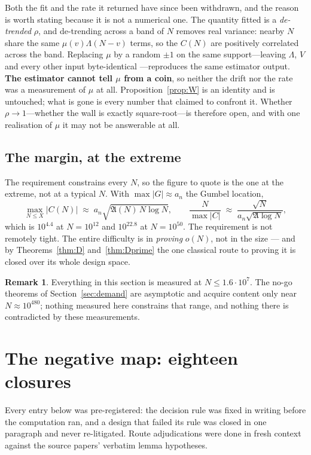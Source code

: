 \documentclass[11pt,a4paper]{article}
\theoremstyle{plain}
\theoremstyle{definition}
\newtheorem{remark}[theorem]{Remark}
\begin{document}
Both the fit and the rate it returned have since been withdrawn, and
the reason is worth stating because it is not a numerical one. The
quantity fitted is a \emph{de-trended} $\rho$, and de-trending across a
band of $N$ removes real variance: nearby $N$ share the same
$\mu(v)\Lambda(N-v)$ terms, so the $C(N)$ are positively correlated
across the band. Replacing $\mu$ by a random $\pm1$ on the same
support---leaving $\Lambda$, $V$ and every other input byte-identical
---reproduces the same estimator output. \textbf{The estimator cannot
tell $\mu$ from a coin}, so neither the drift nor the rate was a
measurement of $\mu$ at all. Proposition~\ref{prop:W} is an identity
and is untouched; what is gone is every number that claimed to confront
it. Whether $\rho\to1$---whether the wall is exactly square-root---is
therefore open, and with one realisation of $\mu$ it may not be
answerable at all.

\subsection{The margin, at the extreme}

The requirement constrains every $N$, so the figure to quote is the one
at the extreme, not at a typical $N$. With
$\max|G|\approx a_n$ the Gumbel location,
\[
  \max_{N\le X}|C(N)| \;\approx\; a_n\sqrt{\mathfrak A(N)\,N\log N},
  \qquad
  \frac{N}{\max|C|}\;\approx\;
  \frac{\sqrt N}{a_n\sqrt{\mathfrak A\log N}},
\]
which is $10^{4.4}$ at $N=10^{12}$ and $10^{22.8}$ at $N=10^{50}$. The
requirement is not remotely tight. The entire difficulty is in
\emph{proving} $o(N)$, not in the size --- and by
Theorems~\ref{thm:D} and~\ref{thm:Dprime} the one classical route to
proving it is closed over its whole design space.

\begin{remark}
Everything in this section is measured at $N\le1.6\cdot10^7$. The
no-go theorems of Section~\ref{sec:demand} are asymptotic and acquire
content only near $N\approx10^{480}$; nothing measured here constrains
that range, and nothing there is contradicted by these measurements.
\end{remark}

\section{The negative map: eighteen closures}\label{sec:closures}

Every entry below was pre-registered: the decision rule was fixed in
writing before the computation ran, and a design that failed its rule
was closed in one paragraph and never re-litigated. Route
adjudications were done in fresh context against the source papers'
verbatim lemma hypotheses.
\end{document}
